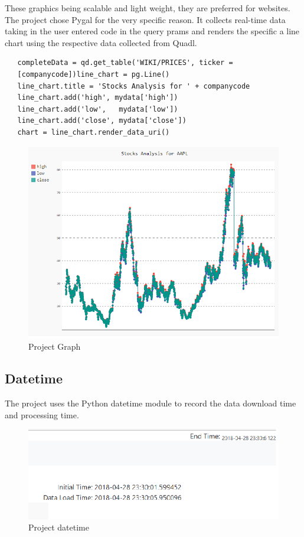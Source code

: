 These graphics being scalable and light weight, they are preferred for
websites. The project chose Pygal for the very specific reason. It collects
real-time data taking in the user entered code in the query prams and renders
the specific a line chart using the respective data collected from Quadl.
\begin{verbatim}
   completeData = qd.get_table('WIKI/PRICES', ticker =
   [companycode])line_chart = pg.Line()
   line_chart.title = 'Stocks Analysis for ' + companycode
   line_chart.add('high', mydata['high'])
   line_chart.add('low',   mydata['low'])
   line_chart.add('close', mydata['close'])
   chart = line_chart.render_data_uri()
\end{verbatim}
\begin{figure}[htb]
	\centering\includegraphics[width=\columnwidth]{images/hid_417_project_graph.png}
  \caption{Project Graph}
  \label{fig:project_graph}
\end{figure}
\subsection{Datetime}

The project uses the Python datetime module to record the data download time
and processing time.
\begin{figure}[htb]
	\centering\includegraphics[width=\columnwidth]{images/hid_417_project_datetime.png}
  \caption{Project datetime}
  \label{fig:kube-datetime}
\end{figure}

